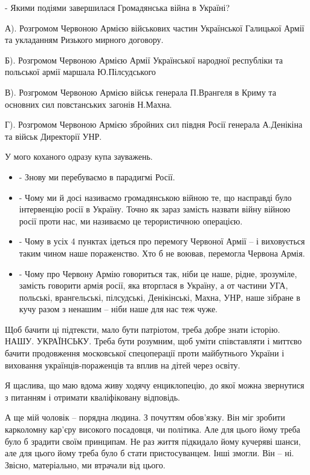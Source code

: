 - Якими подіями завершилася Громадянська війна в Україні? 

А).  Розгромом Червоною Армією військових частин Української Галицької Армії
та укладанням Ризького мирного договору.  

Б).  Розгромом Червоною Армією Армії
Української народної республіки та польської армії маршала Ю.Пілсудського 

В).  Розгромом Червоною Армією військ генерала П.Врангеля в Криму та основних сил
повстанських загонів Н.Махна.  

Г).  Розгромом Червоною Армією збройних сил
півдня Росії генерала А.Денікіна та військ Директорії УНР.

У мого коханого одразу купа зауважень. 

\begin{itemize}
\item - Знову ми перебуваємо в парадигмі Росії. 

\item - Чому ми й досі називаємо громадянською війною те, що насправді було
інтервенцію росії в Україну. Точно як зараз замість  назвати війну війною росії
проти нас, ми називаємо це терористичною операцією. 

\item - Чому в усіх 4 пунктах ідеться про перемогу Червоної Армії – і виховується
таким чином наше пораженство. Хто б не воював, перемогла Червона Армія.

\item - Чому про Червону Армію говориться так, ніби це наше, рідне, зрозуміле,
замість говорити армія росії, яка вторглася в Україну, а от  частини УГА,
польські, врангельські, пілсудські, Денікінські, Махна, УНР, наше зібране в
кучу разом з ненашим – ніби наше для нас теж чуже.
\end{itemize}

Щоб бачити ці підтексти, мало бути патріотом, треба добре знати історію. НАШУ.
УКРАЇНСЬКУ. Треба бути розумним, щоб уміти співставляти і миттєво бачити
продовження московської спецоперації проти майбутнього України  і виховання
українців-пораженців та вплив на дітей через освіту.

Я щаслива, що маю вдома живу ходячу енциклопецію, до якої можна звернутися з
питанням і отримати кваліфіковану відповідь. 

А ще мій чоловік – порядна людина. З почуттям обов’язку. Він міг зробити
карколомну кар’єру високого посадовця, чи політика. Але для цього йому треба
було б зрадити своїм принципам. Не раз життя підкидало йому кучеряві шанси, але
для цього йому треба було б стати пристосуванцем. Інші змогли. Він – ні.
Звісно, матеріально, ми втрачали від цього. 

